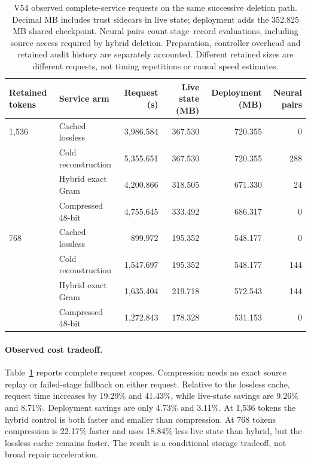 \documentclass[10pt,twocolumn,letterpaper]{article}
\begin{document}
\begin{table}[t]
\centering
\small
\begin{tabular}{llrrrr}
\toprule
Retained tokens & Service arm & Request (s) & Live state (MB) & Deployment (MB) & Neural pairs \\
\midrule
1,536 & Cached lossless & 3,986.584 & 367.530 & 720.355 & 0 \\
      & Cold reconstruction & 5,355.651 & 367.530 & 720.355 & 288 \\
      & Hybrid exact Gram & 4,200.866 & 318.505 & 671.330 & 24 \\
      & Compressed 48-bit & 4,755.645 & 333.492 & 686.317 & 0 \\
\midrule
768 & Cached lossless & 899.972 & 195.352 & 548.177 & 0 \\
    & Cold reconstruction & 1,547.697 & 195.352 & 548.177 & 144 \\
    & Hybrid exact Gram & 1,635.404 & 219.718 & 572.543 & 144 \\
    & Compressed 48-bit & 1,272.843 & 178.328 & 531.153 & 0 \\
\bottomrule
\end{tabular}
\caption{V54 observed complete-service requests on the same successive deletion
path. Decimal MB includes trust sidecars in live state; deployment adds the
352.825 MB shared checkpoint. Neural pairs count stage--record evaluations,
including source access required by hybrid deletion. Preparation, controller
overhead and retained audit history are separately accounted. Different retained
sizes are different requests, not timing repetitions or causal speed estimates.}
\label{tab:v54}
\end{table}

\paragraph{Observed cost tradeoff.}
Table~\ref{tab:v54} reports complete request scopes. Compression needs no exact
source replay or failed-stage fallback on either request. Relative to the
lossless cache, request time increases by 19.29\% and 41.43\%, while live-state
savings are 9.26\% and 8.71\%. Deployment savings are only 4.73\% and 3.11\%.
At 1,536 tokens the hybrid control is both faster and smaller than compression.
At 768 tokens compression is 22.17\% faster and uses 18.84\% less live state
than hybrid, but the lossless cache remains faster. The result is a conditional
storage tradeoff, not broad repair acceleration.
\end{document}
